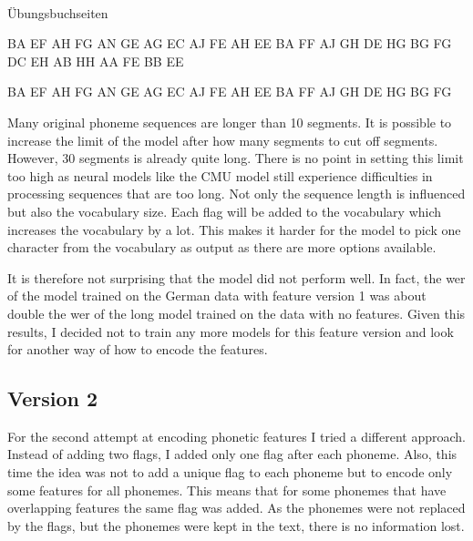\begin{covsubexamples}[preamble={The CMU model cuts off phoneme sequences that are longer than 30 segments. Sub-example (a) shows the original phoneme sequence without features and the corresponding grapheme sequence. Sub-example (b) shows the full length phoneme sequence with features and sub-example (c) shows the shortened version with features. It is easily understandable that there is a lot of information lost if a sequence is shortened like that.}]
\label{ex:cut-off}
\item \label{ex:cut-off1}  \\ Übungsbuchseiten
\item \label{ex:cut-off2}  BA EF  AH FG  AN GE  AG EC  AJ FE  AH EE  BA FF  AJ GH  DE HG  BG FG  DC EH  AB HH  AA FE  BB EE
\item \label{ex:cut-off3}  BA EF  AH FG  AN GE  AG EC  AJ FE  AH EE  BA FF  AJ GH  DE HG  BG FG 
\end{covsubexamples}



Many original phoneme sequences are longer than 10 segments. It is possible to increase the limit of the model after how many segments to cut off segments. However, 30 segments is already quite long. There is no point in setting this limit too high as neural models like the CMU model still experience difficulties in processing sequences that are too long. Not only the sequence length is influenced but also the vocabulary size. Each flag will be added to the vocabulary which increases the vocabulary by a lot. This makes it harder for the model to pick one character from the vocabulary as output as there are more options available.  

It is therefore not surprising that the model did not perform well. In fact, the \ac{wer} of the model trained on the German data with feature version 1 was about double the \ac{wer} of the long model trained on the data with no features. Given this results, I decided not to train any more models for this feature version and look for another way of how to encode the features.

\subsection*{Version 2}
For the second attempt at encoding phonetic features I tried a different approach. Instead of adding two flags, I added only one flag after each phoneme. Also, this time the idea was not to add a unique flag to each phoneme but to encode only some features for all phonemes. This means that for some phonemes that have overlapping features the same flag was added. As the phonemes were not replaced by the flags, but the phonemes were kept in the text, there is no information lost. 

